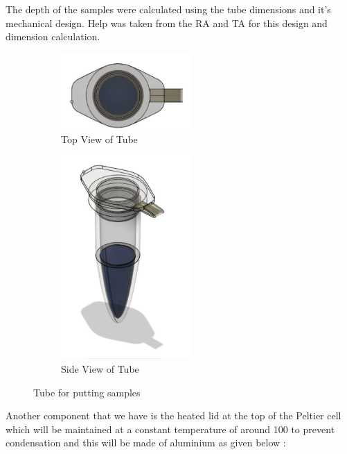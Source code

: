 \documentclass[12pt]{article}
\begin{document}
The depth of the samples were calculated using the tube dimensions and it's mechanical design. Help was taken from the RA and TA for this design and dimension calculation.


\begin{figure}[htp]
    \centering
    \begin{subfigure}[b]{0.4\textwidth}
    \centering
    \includegraphics[width=5cm]{Images/Tubetop.jpeg}
    \caption{Top View of Tube}
    \end{subfigure}
    \hfill
    \begin{subfigure}[b]{0.5\textwidth}
    \centering
    \includegraphics[width=5cm]{Images/Tubeside.jpeg}
    \caption{Side View of Tube}
    \end{subfigure}
    \caption{Tube for putting samples}
    \label{fig:galaxy}
\end{figure}

\newpage
Another component that we have is the heated lid at the top of the Peltier cell which will be maintained at a constant temperature of around 100 to prevent condensation and this will be made of aluminium as given below :\\
\end{document}
